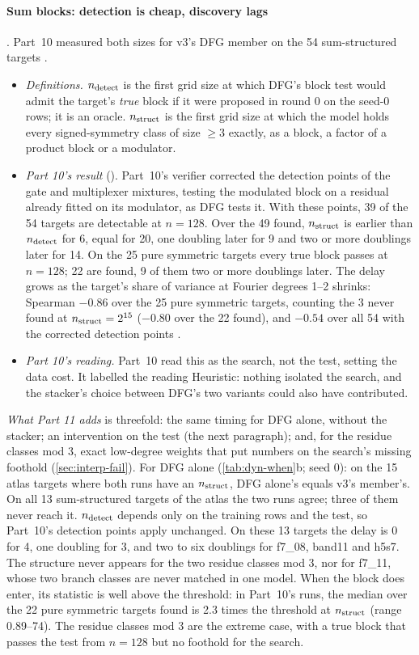 \paragraph{Sum blocks: detection is cheap, discovery lags} . Part~10 measured both sizes for v3's DFG member on the 54 sum-structured targets \cite{portfoliolearner2026}.
\begin{itemize}
\item \emph{Definitions.} $n_{\rm detect}$ is the first grid size at which DFG's block test would admit the target's \emph{true} block if it were proposed in round 0 on the seed-0 rows; it is an oracle. $n_{\rm struct}$ is the first grid size at which the model holds every signed-symmetry class of size $\ge3$ exactly, as a block, a factor of a product block or a modulator.
\item \emph{Part 10's result} (). Part~10's verifier corrected the detection points of the gate and multiplexer mixtures, testing the modulated block on a residual already fitted on its modulator, as DFG tests it. With these points, 39 of the 54 targets are detectable at $n=128$. Over the 49 found, $n_{\rm struct}$ is earlier than $n_{\rm detect}$ for 6, equal for 20, one doubling later for 9 and two or more doublings later for 14. On the 25 pure symmetric targets every true block passes at $n=128$; 22 are found, 9 of them two or more doublings later. The delay grows as the target's share of variance at Fourier degrees 1--2 shrinks: Spearman $-0.86$ over the 25 pure symmetric targets, counting the 3 never found at $n_{\rm struct}=2^{15}$ ($-0.80$ over the 22 found), and $-0.54$ over all 54 with the corrected detection points \cite{portfoliolearner2026}.
\item \emph{Part 10's reading.} Part~10 read this as the search, not the test, setting the data cost. It labelled the reading Heuristic: nothing isolated the search, and the stacker's choice between DFG's two variants could also have contributed.
\end{itemize}
\emph{What Part 11 adds} is threefold: the same timing for DFG alone, without the stacker; an intervention on the test (the next paragraph); and, for the residue classes mod 3, exact low-degree weights that put numbers on the search's missing foothold (\cref{sec:interp-fail}). For DFG alone (\cref{tab:dyn-when}b; seed 0): on the 15 atlas targets where both runs have an $n_{\rm struct}$, DFG alone's equals v3's member's. On all 13 sum-structured targets of the atlas the two runs agree; three of them never reach it. $n_{\rm detect}$ depends only on the training rows and the test, so Part~10's detection points apply unchanged. On these 13 targets the delay is 0 for 4, one doubling for 3, and two to six doublings for f7\_08, band11 and h5s7. The structure never appears for the two residue classes mod 3, nor for f7\_11, whose two branch classes are never matched in one model. When the block does enter, its statistic is well above the threshold: in Part~10's runs, the median over the 22 pure symmetric targets found is 2.3 times the threshold at $n_{\rm struct}$ (range 0.89--74). The residue classes mod 3 are the extreme case, with a true block that passes the test from $n=128$ but no foothold for the search.

